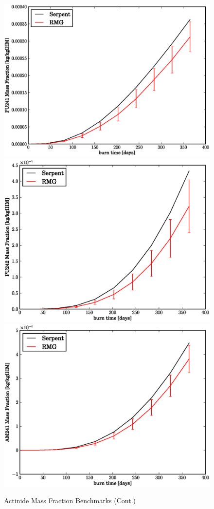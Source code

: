 \begin{figure}[htbp]
\caption{Actinide Mass Fraction Benchmarks (Cont.)}
\label{act_benchmark_cont}
\begin{center}
\includegraphics[scale=0.3]{multigroup_method/figs/benchmark/PU241_Mass_Fraction_.eps}
\includegraphics[scale=0.3]{multigroup_method/figs/benchmark/PU242_Mass_Fraction_.eps}
\includegraphics[scale=0.3]{multigroup_method/figs/benchmark/AM241_Mass_Fraction_.eps}

\end{center}
\end{figure}
